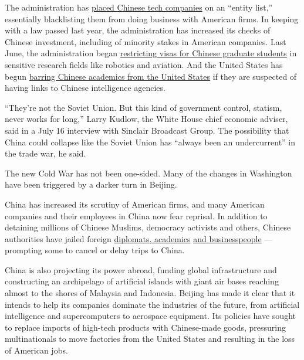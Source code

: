 The administration has
\href{https://www.nytimes.com/2019/06/21/us/politics/us-china-trade-blacklist.html}{placed
Chinese tech companies} on an ``entity list,'' essentially blacklisting
them from doing business with American firms. In keeping with a law
passed last year, the administration has increased its checks of Chinese
investment, including of minority stakes in American companies. Last
June, the administration began
\href{https://www.nytimes.com/2018/07/25/us/politics/visa-restrictions-chinese-students.html}{restricting
visas for Chinese graduate students} in sensitive research fields like
robotics and aviation. And the United States has begun
\href{https://www.nytimes.com/2019/04/14/world/asia/china-academics-fbi-visa-bans.html}{barring
Chinese academics from the United States} if they are suspected of
having links to Chinese intelligence agencies.

``They're not the Soviet Union. But this kind of government control,
statism, never works for long,'' Larry Kudlow, the White House chief
economic adviser, said in a July 16 interview with Sinclair Broadcast
Group. The possibility that China could collapse like the Soviet Union
has ``always been an undercurrent'' in the trade war, he said.

The new Cold War has not been one-sided. Many of the changes in
Washington have been triggered by a darker turn in Beijing.

China has increased its scrutiny of American firms, and many American
companies and their employees in China now fear reprisal. In addition to
detaining millions of Chinese Muslims, democracy activists and others,
Chinese authorities have jailed foreign
\href{https://www.nytimes.com/2019/05/16/world/asia/china-canadian-arrested.html}{diplomats,
academics}
\href{https://www.nytimes.com/2019/07/11/business/american-businesses-china.html?action=click\&module=Top\%20Stories\&pgtype=Homepage}{and
businesspeople} --- prompting some to cancel or delay trips to China.

China is also projecting its power abroad, funding global infrastructure
and constructing an archipelago of artificial islands with giant air
bases reaching almost to the shores of Malaysia and Indonesia. Beijing
has made it clear that it intends to help its companies dominate the
industries of the future, from artificial intelligence and
supercomputers to aerospace equipment. Its policies have sought to
replace imports of high-tech products with Chinese-made goods,
pressuring multinationals to move factories from the United States and
resulting in the loss of American jobs.


